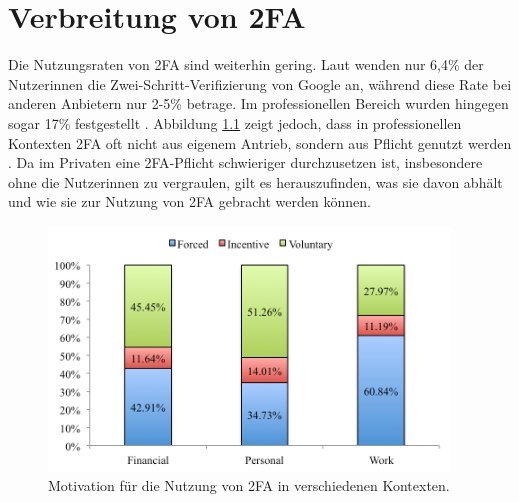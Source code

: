 \chapter{Verbreitung von \acl{2FA}}
\label{sec:adoption}

Die Nutzungsraten von \ac{2FA} sind weiterhin gering. Laut \textcite{petsasTwofactorAuthentication2015} wenden nur 6,4\% der Nutzerinnen die Zwei-Schritt-Verifizierung von Google an, während diese Rate bei anderen Anbietern nur 2-5\% betrage. Im professionellen Bereich wurden hingegen sogar 17\% festgestellt \parencite{ackermanImpedimentsAdoption2020}. Abbildung \ref{fig:motivation} zeigt jedoch, dass in professionellen Kontexten \ac{2FA} oft nicht aus eigenem Antrieb, sondern aus Pflicht genutzt werden \parencite{decristofaroComparativeUsability2014}. Da im Privaten eine \ac{2FA}-Pflicht schwieriger durchzusetzen ist, insbesondere ohne die Nutzerinnen zu vergraulen, gilt es herauszufinden, was sie davon abhält und wie sie zur Nutzung von \ac{2FA} gebracht werden können.

\begin{figure}
  \begin{center}
    \includegraphics[width=0.95\textwidth]{assets/motivation.png}
  \end{center}
  \caption[Motivation für die Nutzung von \acs{2FA} in verschiedenen Kontexten]{Motivation für die Nutzung von \acs{2FA} in verschiedenen Kontexten.\\\parencite[6]{decristofaroComparativeUsability2014}}
  \label{fig:motivation}
\end{figure}


